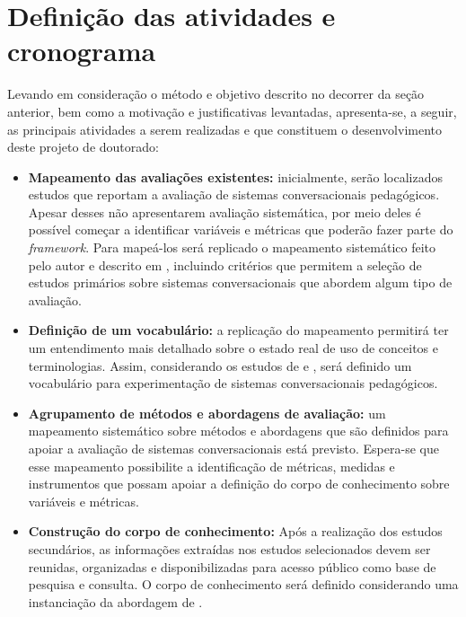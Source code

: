 \section{Definição das atividades e cronograma}

Levando em consideração o método e objetivo descrito no decorrer da seção anterior, bem como a motivação e justificativas levantadas, apresenta-se, a seguir, as principais atividades a serem realizadas e que constituem o desenvolvimento deste projeto de doutorado:

\begin{itemize}

\item \textbf{Mapeamento das avaliações existentes:} inicialmente, serão localizados estudos que reportam a avaliação de sistemas conversacionais pedagógicos. Apesar desses não apresentarem avaliação sistemática, por meio deles é possível começar a identificar variáveis e métricas que poderão fazer parte do \textit{framework}. Para mapeá-los será replicado o mapeamento sistemático feito pelo autor e descrito em , incluindo critérios que permitem a seleção de estudos primários sobre sistemas conversacionais que abordem algum tipo de avaliação.

\item \textbf{Definição de um vocabulário:} a replicação do mapeamento permitirá ter um entendimento mais detalhado sobre o estado real de uso de conceitos e terminologias. Assim, considerando os estudos de  e , será definido um vocabulário para experimentação de sistemas conversacionais pedagógicos. 

\item \textbf{Agrupamento de métodos e abordagens de avaliação:} um mapeamento sistemático sobre métodos e abordagens que são definidos para apoiar a avaliação de sistemas conversacionais está previsto. Espera-se que esse mapeamento possibilite a identificação de métricas, medidas e instrumentos que possam apoiar a definição do corpo de conhecimento sobre variáveis e métricas. 

\item \textbf{Construção do corpo de conhecimento:} Após a realização dos estudos secundários, as informações extraídas nos estudos selecionados devem ser reunidas, organizadas e disponibilizadas para acesso público como base de pesquisa e consulta. O corpo de conhecimento será definido considerando uma instanciação da abordagem de .


\end{itemize}
